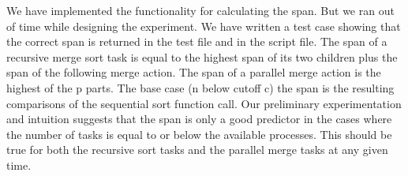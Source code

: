 \documentclass[11pt, a4paper]{article}
\begin{document}
We have implemented the functionality for calculating the span. But we ran out of time while designing the experiment. We have written a test case showing that the correct span is returned in the test file and in the script file. The span of a recursive merge sort task is equal to the highest span of its two children plus the span of the following merge action. The span of a parallel merge action is the highest of the p parts. The base case (n below cutoff c) the span is the resulting comparisons of the sequential sort function call. Our preliminary experimentation and intuition suggests that the span is only a good predictor in the cases where the number of tasks is equal to or below the available processes.
This should be true for both the recursive sort tasks and the parallel merge tasks at any given time.

\newpage


\end{document}

